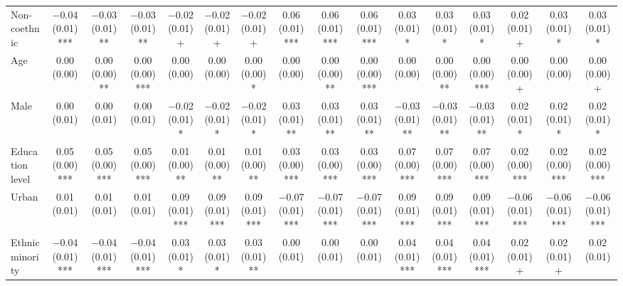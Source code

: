 \begin{table}[H]
\begin{tabular}[t]{lccccccccccccccc}
Non-coethnic & \num{-0.04} (\num{0.01})*** & \num{-0.03} (\num{0.01})** & \num{-0.03} (\num{0.01})** & \num{-0.02} (\num{0.01})+ & \num{-0.02} (\num{0.01})+ & \num{-0.02} (\num{0.01})+ & \num{0.06} (\num{0.01})*** & \num{0.06} (\num{0.01})*** & \num{0.06} (\num{0.01})*** & \num{0.03} (\num{0.01})* & \num{0.03} (\num{0.01})* & \num{0.03} (\num{0.01})* & \num{0.02} (\num{0.01})+ & \num{0.03} (\num{0.01})* & \num{0.03} (\num{0.01})*\\
Age & \num{0.00} (\num{0.00}) & \num{0.00} (\num{0.00})** & \num{0.00} (\num{0.00})*** & \num{0.00} (\num{0.00}) & \num{0.00} (\num{0.00}) & \num{0.00} (\num{0.00})* & \num{0.00} (\num{0.00}) & \num{0.00} (\num{0.00})** & \num{0.00} (\num{0.00})*** & \num{0.00} (\num{0.00}) & \num{0.00} (\num{0.00})** & \num{0.00} (\num{0.00})*** & \num{0.00} (\num{0.00})+ & \num{0.00} (\num{0.00}) & \num{0.00} (\num{0.00})+\\
Male & \num{0.00} (\num{0.01}) & \num{0.00} (\num{0.01}) & \num{0.00} (\num{0.01}) & \num{-0.02} (\num{0.01})* & \num{-0.02} (\num{0.01})* & \num{-0.02} (\num{0.01})* & \num{0.03} (\num{0.01})** & \num{0.03} (\num{0.01})** & \num{0.03} (\num{0.01})** & \num{-0.03} (\num{0.01})** & \num{-0.03} (\num{0.01})** & \num{-0.03} (\num{0.01})** & \num{0.02} (\num{0.01})* & \num{0.02} (\num{0.01})* & \num{0.02} (\num{0.01})*\\
Education level & \num{0.05} (\num{0.00})*** & \num{0.05} (\num{0.00})*** & \num{0.05} (\num{0.00})*** & \num{0.01} (\num{0.00})** & \num{0.01} (\num{0.00})** & \num{0.01} (\num{0.00})** & \num{0.03} (\num{0.00})*** & \num{0.03} (\num{0.00})*** & \num{0.03} (\num{0.00})*** & \num{0.07} (\num{0.00})*** & \num{0.07} (\num{0.00})*** & \num{0.07} (\num{0.00})*** & \num{0.02} (\num{0.00})*** & \num{0.02} (\num{0.00})*** & \num{0.02} (\num{0.00})***\\
Urban & \num{0.01} (\num{0.01}) & \num{0.01} (\num{0.01}) & \num{0.01} (\num{0.01}) & \num{0.09} (\num{0.01})*** & \num{0.09} (\num{0.01})*** & \num{0.09} (\num{0.01})*** & \num{-0.07} (\num{0.01})*** & \num{-0.07} (\num{0.01})*** & \num{-0.07} (\num{0.01})*** & \num{0.09} (\num{0.01})*** & \num{0.09} (\num{0.01})*** & \num{0.09} (\num{0.01})*** & \num{-0.06} (\num{0.01})*** & \num{-0.06} (\num{0.01})*** & \num{-0.06} (\num{0.01})***\\
Ethnic minority & \num{-0.04} (\num{0.01})*** & \num{-0.04} (\num{0.01})*** & \num{-0.04} (\num{0.01})*** & \num{0.03} (\num{0.01})* & \num{0.03} (\num{0.01})* & \num{0.03} (\num{0.01})** & \num{0.00} (\num{0.01}) & \num{0.00} (\num{0.01}) & \num{0.00} (\num{0.01}) & \num{0.04} (\num{0.01})*** & \num{0.04} (\num{0.01})*** & \num{0.04} (\num{0.01})*** & \num{0.02} (\num{0.01})+ & \num{0.02} (\num{0.01})+ & \num{0.02} (\num{0.01})\\

\end{tabular}
\end{table}

